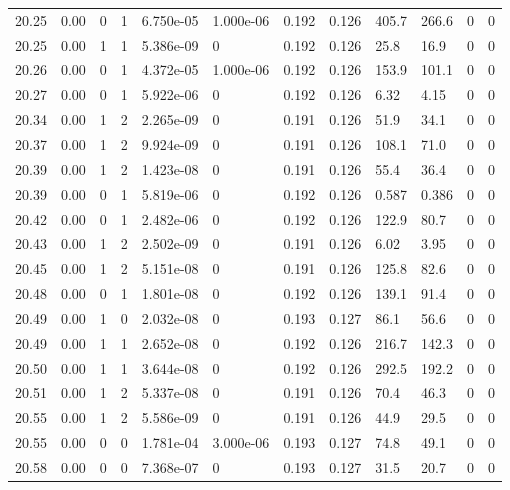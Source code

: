 \documentclass[preview]{standalone}
\begin{document}
{{{{{{{{{{{{{{{{\begin{tabular}{L{1.2cm}C{1.2cm} C{0.3cm}C{0.5cm} C{1.4cm}C{1.4cm} C{1.4cm}C{1.4cm} C{1.6cm}C{1.6cm} C{1.6cm}C{1.6cm}}
  20.25  &  0.00  & 0     &  1 &  6.750e-05  & 1.000e-06  &  0.192&   0.126& 405.7 & 266.6   &  0 & 0  \\ 
  20.25  &  0.00  & 1     &  1 &  5.386e-09  & 0  &  0.192&   0.126& 25.8 & 16.9   &  0 & 0  \\ 
  20.26  &  0.00  & 0     &  1 &  4.372e-05  & 1.000e-06  &  0.192&   0.126& 153.9 & 101.1   &  0 & 0  \\ 
  20.27  &  0.00  & 0     &  1 &  5.922e-06  & 0  &  0.192&   0.126& 6.32 & 4.15   &  0 & 0  \\ 
  20.34  &  0.00  & 1     &  2 &  2.265e-09  & 0  &  0.191&   0.126& 51.9 & 34.1   &  0 & 0  \\ 
  20.37  &  0.00  & 1     &  2 &  9.924e-09  & 0  &  0.191&   0.126& 108.1 & 71.0   &  0 & 0  \\ 
  20.39  &  0.00  & 1     &  2 &  1.423e-08  & 0  &  0.191&   0.126& 55.4 & 36.4   &  0 & 0  \\ 
  20.39  &  0.00  & 0     &  1 &  5.819e-06  & 0  &  0.192&   0.126& 0.587 & 0.386   &  0 & 0  \\ 
  20.42  &  0.00  & 0     &  1 &  2.482e-06  & 0  &  0.192&   0.126& 122.9 & 80.7   &  0 & 0  \\ 
  20.43  &  0.00  & 1     &  2 &  2.502e-09  & 0  &  0.191&   0.126& 6.02 & 3.95   &  0 & 0  \\ 
  20.45  &  0.00  & 1     &  2 &  5.151e-08  & 0  &  0.191&   0.126& 125.8 & 82.6   &  0 & 0  \\ 
  20.48  &  0.00  & 0     &  1 &  1.801e-08  & 0  &  0.192&   0.126& 139.1 & 91.4   &  0 & 0  \\ 
  20.49  &  0.00  & 1     &  0 &  2.032e-08  & 0  &  0.193&   0.127& 86.1 & 56.6   &  0 & 0  \\ 
  20.49  &  0.00  & 1     &  1 &  2.652e-08  & 0  &  0.192&   0.126& 216.7 & 142.3   &  0 & 0  \\ 
  20.50  &  0.00  & 1     &  1 &  3.644e-08  & 0  &  0.192&   0.126& 292.5 & 192.2   &  0 & 0  \\ 
  20.51  &  0.00  & 1     &  2 &  5.337e-08  & 0  &  0.191&   0.126& 70.4 & 46.3   &  0 & 0  \\ 
  20.55  &  0.00  & 1     &  2 &  5.586e-09  & 0  &  0.191&   0.126& 44.9 & 29.5   &  0 & 0  \\ 
  20.55  &  0.00  & 0     &  0 &  1.781e-04  & 3.000e-06  &  0.193&   0.127& 74.8 & 49.1   &  0 & 0  \\ 
  20.58  &  0.00  & 0     &  0 &  7.368e-07  & 0  &  0.193&   0.127& 31.5 & 20.7   &  0 & 0  \\ 

\end{tabular}}}}}}}}}}}}}}}}}
\end{document}
